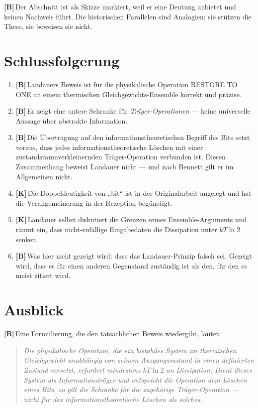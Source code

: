 \documentclass[11pt,a4paper]{article}
\newcommand{\LK}{\textcolor{layK}{\textbf{\footnotesize\textsf{[K]}}}\,}
\newcommand{\LB}{\textcolor{layB}{\textbf{\footnotesize\textsf{[B]}}}\,}
\theoremstyle{ffgft}
\begin{document}
\LB Der Abschnitt ist als Skizze markiert, weil er eine Deutung anbietet und
keinen Nachweis führt. Die historischen Parallelen sind Analogien; sie stützen die
These, sie beweisen sie nicht.

\section{Schlussfolgerung}

\begin{enumerate}[leftmargin=1.6em,itemsep=0.35em]
  \item \LB Landauers Beweis ist für die physikalische Operation
        \textup{RESTORE TO ONE} an einem thermischen Gleichgewichts-Ensemble
        korrekt und präzise.
  \item \LB Er zeigt eine untere Schranke für \emph{Träger-Operationen} --- keine
        universelle Aussage über abstrakte Information.
  \item \LB Die Übertragung auf den informationstheoretischen Begriff des Bits
        setzt voraus, dass jedes informationstheoretische Löschen mit einer
        zustandsraumverkleinernden Träger-Operation verbunden ist. Diesen
        Zusammenhang beweist Landauer nicht --- und nach Bennett gilt er im
        Allgemeinen nicht.
  \item \LK Die Doppeldeutigkeit von „bit“ ist in der Originalarbeit angelegt und
        hat die Verallgemeinerung in der Rezeption begünstigt.
  \item \LK Landauer selbst diskutiert die Grenzen seines Ensemble-Arguments und
        räumt ein, dass nicht-zufällige Eingabedaten die Dissipation unter
        $kT\ln 2$ senken.
  \item \LB Was hier nicht gezeigt wird: dass das Landauer-Prinzip falsch sei.
        Gezeigt wird, dass es für einen anderen Gegenstand zuständig ist als den,
        für den es meist zitiert wird.
\end{enumerate}

\section{Ausblick}

\LB Eine Formulierung, die den tatsächlichen Beweis wiedergibt, lautet:

\begin{quote}
\emph{Die physikalische Operation, die ein bistabiles System im thermischen
Gleichgewicht unabhängig von seinem Ausgangszustand in einen definierten Zustand
versetzt, erfordert mindestens $kT\ln 2$ an Dissipation. Dient dieses System als
Informationsträger und entspricht die Operation dem Löschen eines Bits, so gilt
die Schranke für die zugehörige Träger-Operation --- nicht für das
informationstheoretische Löschen als solches.}
\end{quote}
\end{document}
